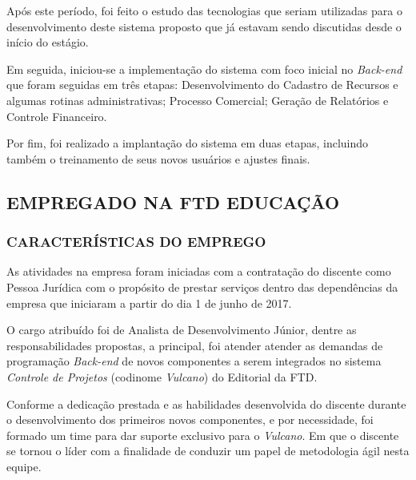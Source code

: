 \documentclass[
  12pt,				%
  openany,
  oneside,
  a4paper,			%
  english,			%
  brazil
]{article}
\numberwithin{figure}{section}
\numberwithin{table}{section}
\begin{document}
Após este período, foi feito o estudo das tecnologias que seriam utilizadas para o desenvolvimento deste sistema proposto que já estavam sendo discutidas desde o início do estágio.

Em seguida, iniciou-se a implementação do sistema com foco inicial no \textit{Back-end} que foram seguidas em três etapas: Desenvolvimento do Cadastro de Recursos e algumas rotinas administrativas; Processo Comercial; Geração de Relatórios e Controle Financeiro.

Por fim, foi realizado a implantação do sistema em duas etapas, incluindo também o treinamento de seus novos usuários e ajustes finais.



\subsection{EMPREGADO NA FTD EDUCAÇÃO}

\subsubsection{CARACTERÍSTICAS DO EMPREGO}

As atividades na empresa foram iniciadas com a contratação do discente como Pessoa Jurídica com o propósito de prestar serviços dentro das dependências da empresa que iniciaram a partir do dia 1 de junho de 2017. 

O cargo atribuído foi de Analista de Desenvolvimento Júnior, dentre as responsabilidades propostas, a principal, foi atender atender as demandas de programação \textit{Back-end} de novos componentes a serem integrados no sistema \textit{Controle de Projetos} (codinome \textit{Vulcano}) do Editorial da FTD.



Conforme a dedicação prestada e as habilidades desenvolvida do discente durante o desenvolvimento dos primeiros novos componentes, e por necessidade, foi formado um time para dar suporte exclusivo para o \textit{Vulcano}. Em que o discente se tornou o líder com a finalidade de conduzir um papel de metodologia ágil nesta equipe.
\end{document}
